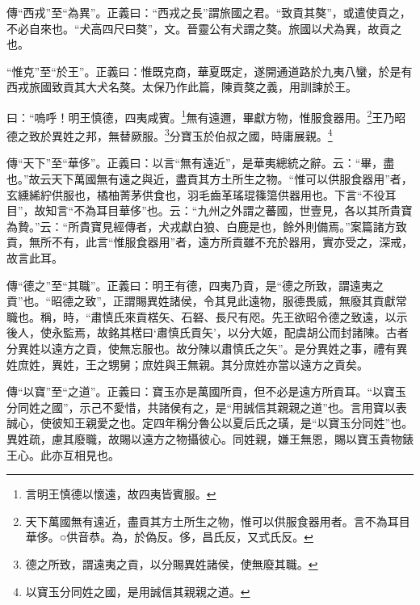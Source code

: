 {\noindent\zhuan{}\fzbyks 傳“西戎”至“為異”。正義曰：“西戎之長”謂旅國之君。“致貢其獒”，或遣使貢之，不必自來也。“犬高四尺曰獒”，文。晉靈公有犬謂之獒。旅國以犬為異，故貢之也。 \par}

{\noindent\shu{}\fzkt “惟克”至“於王”。正義曰：惟既克商，華夏既定，遂開通道路於九夷八蠻，於是有西戎旅國致貢其大犬名獒。太保乃作此篇，陳貢獒之義，用訓諫於王。 \par}

曰：“嗚呼！明王慎德，四夷咸賓。\footnote{言明王慎德以懷遠，故四夷皆賓服。}無有遠邇，畢獻方物，惟服食器用。\footnote{天下萬國無有遠近，盡貢其方土所生之物，惟可以供服食器用者。言不為耳目華侈。○供音恭。為，於偽反。侈，昌氏反，又式氏反。}王乃昭德之致於異姓之邦，無替厥服。\footnote{德之所致，謂遠夷之貢，以分賜異姓諸侯，使無廢其職。}分寶玉於伯叔之國，時庸展親。\footnote{以寶玉分同姓之國，是用誠信其親親之道。}


{\noindent\zhuan{}\fzbyks 傳“天下”至“華侈”。正義曰：以言“無有遠近”，是華夷總統之辭。云：“畢，盡也。”故云天下萬國無有遠之與近，盡貢其方土所生之物。“惟可以供服食器用”者，玄纁絺紵供服也，橘柚菁茅供食也，羽毛齒革瑤琨篠簜供器用也。下言“不役耳目”，故知言“不為耳目華侈”也。云：“九州之外謂之蕃國，世壹見，各以其所貴寶為贄。”云：“所貴寶見經傳者，犬戎獻白狼、白鹿是也，餘外則備焉。”案篇諸方致貢，無所不有，此言“惟服食器用”者，遠方所貢雖不充於器用，實亦受之，深戒，故言此耳。 \par}

{\noindent\zhuan{}\fzbyks 傳“德之”至“其職”。正義曰：明王有德，四夷乃貢，是“德之所致，謂遠夷之貢”也。“昭德之致”，正謂賜異姓諸侯，令其見此遠物，服德畏威，無廢其貢獻常職也。稱，時，“肅慎氏來貢楛矢、石砮、長尺有咫。先王欲昭令德之致遠，以示後人，使永監焉，故銘其楛曰‘肅慎氏貢矢’，以分大姬，配虞胡公而封諸陳。古者分異姓以遠方之貢，使無忘服也。故分陳以肅慎氏之矢”。是分異姓之事，禮有異姓庶姓，異姓，王之甥舅；庶姓與王無親。其分庶姓亦當以遠方之貢矣。 \par}

{\noindent\zhuan{}\fzbyks 傳“以寶”至“之道”。正義曰：寶玉亦是萬國所貢，但不必是遠方所貢耳。“以寶玉分同姓之國”，示己不愛惜，共諸侯有之，是“用誠信其親親之道”也。言用寶以表誠心，使彼知王親愛之也。定四年稱分魯公以夏后氏之璜，是“以寶玉分同姓”也。異姓疏，慮其廢職，故賜以遠方之物攝彼心。同姓親，嫌王無恩，賜以寶玉貴物錶王心。此亦互相見也。 \par}

